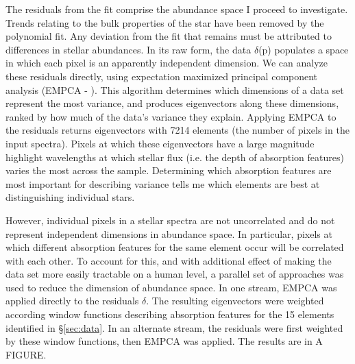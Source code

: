 \documentclass[preprint]{aastex}
\begin{document}
The residuals from the fit comprise the abundance space I proceed to investigate. Trends relating to the bulk properties of the star have been removed by the polynomial fit. Any deviation from the fit that remains must be attributed to differences in stellar abundances. In its raw form, the data $\delta$(p) populates a space in which each pixel is an apparently independent dimension. We can analyze these residuals directly, using expectation maximized principal component analysis (EMPCA - \citealt{empca}).  This algorithm determines which dimensions of a data set represent the most variance, and produces eigenvectors along these dimensions, ranked by how much of the data's variance they explain. Applying EMPCA to the residuals returns eigenvectors with 7214 elements (the number of pixels in the input spectra). Pixels at which these eigenvectors have a large magnitude highlight wavelengths at which stellar flux (i.e. the depth of absorption features) varies the most across the sample. Determining which absorption features are most important for describing variance tells me which elements are best at distinguishing individual stars.

However, individual pixels in a stellar spectra are not uncorrelated and do not represent independent dimensions in abundance space. In particular, pixels at which different absorption features for the same element occur will be correlated with each other. To account for this, and with additional effect of making the data set more easily tractable on a human level, a parallel set of approaches was used to reduce the dimension of abundance space. In one stream, EMPCA was applied directly to the residuals $\delta$. The resulting eigenvectors were weighted according window functions describing absorption features for the 15 elements identified in \S \ref{sec:data}. In an alternate stream, the residuals were first weighted by these window functions, then EMPCA was applied. The results are in A FIGURE.

\end{document}
